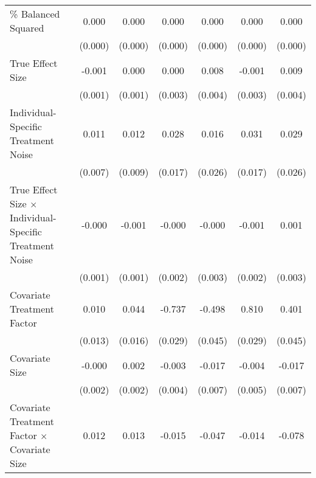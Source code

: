\begin{table}[htbp]
{\begin{tabular}{p{4.5in}|*{6}{c}}
\% Balanced Squared &       0.000\sym{***}&       0.000\sym{***}&       0.000\sym{***}&       0.000\sym{***}&       0.000\sym{***}&       0.000\sym{***}\\
                    &     (0.000)         &     (0.000)         &     (0.000)         &     (0.000)         &     (0.000)         &     (0.000)         \\
True Effect Size    &      -0.001         &       0.000         &       0.000         &       0.008\sym{*}  &      -0.001         &       0.009\sym{*}  \\
                    &     (0.001)         &     (0.001)         &     (0.003)         &     (0.004)         &     (0.003)         &     (0.004)         \\
Individual-Specific Treatment Noise&       0.011         &       0.012         &       0.028         &       0.016         &       0.031         &       0.029         \\
                    &     (0.007)         &     (0.009)         &     (0.017)         &     (0.026)         &     (0.017)         &     (0.026)         \\
True Effect Size $\times$ Individual-Specific Treatment Noise&      -0.000         &      -0.001         &      -0.000         &      -0.000         &      -0.001         &       0.001         \\
                    &     (0.001)         &     (0.001)         &     (0.002)         &     (0.003)         &     (0.002)         &     (0.003)         \\
Covariate Treatment Factor&       0.010         &       0.044\sym{**} &      -0.737\sym{***}&      -0.498\sym{***}&       0.810\sym{***}&       0.401\sym{***}\\
                    &     (0.013)         &     (0.016)         &     (0.029)         &     (0.045)         &     (0.029)         &     (0.045)         \\
Covariate Size      &      -0.000         &       0.002         &      -0.003         &      -0.017\sym{*}  &      -0.004         &      -0.017\sym{*}  \\
                    &     (0.002)         &     (0.002)         &     (0.004)         &     (0.007)         &     (0.005)         &     (0.007)         \\
Covariate Treatment Factor $\times$ Covariate Size&       0.012\sym{**} &       0.013\sym{*}  &      -0.015         &      -0.047\sym{**} &      -0.014         &      -0.078\sym{***}\\

\end{tabular}}
\end{table}
